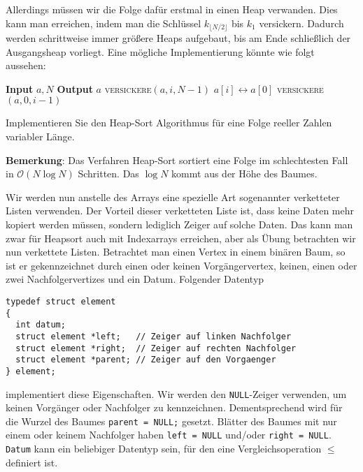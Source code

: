 \documentclass[tikz,12pt]{article}
\begin{document}
Allerdings müssen wir die Folge dafür erstmal in einen Heap verwanden. 
Dies kann man erreichen, indem man die Schlüssel $k_{\lfloor N/2\rfloor}$ bis $k_1$ versickern. 
Dadurch werden schrittweise immer größere Heaps aufgebaut, bis am Ende schließlich der Ausgangsheap vorliegt. 
Eine mögliche Implementierung könnte wie folgt aussehen:
\begin{algorithmic}[1]
  \State \textbf{Input} $a,N$
  \State \textbf{Output} $a$
  \State \textsc{versickere}$(a, i, N-1)$
  \EndFor
  \State $a[i]\leftrightarrow a[0]$
  \State \textsc{versickere}$(a, 0, i-1)$
  \EndFor
  \EndProcedure
\end{algorithmic}
Implementieren Sie den Heap-Sort Algorithmus für eine Folge reeller Zahlen variabler Länge.

\textbf{Bemerkung}: Das Verfahren Heap-Sort sortiert eine Folge im schlechtesten Fall in $\mathcal{O}(N\log N)$ Schritten.
Das $\log N$ kommt aus der Höhe des Baumes.

Wir werden nun anstelle des Arrays eine spezielle Art sogenannter verketteter Listen verwenden.
Der Vorteil dieser verketteten Liste ist, dass keine Daten mehr kopiert werden müssen, sondern lediglich Zeiger auf solche Daten.
Das kann man zwar für Heapsort auch mit Indexarrays erreichen, aber als Übung betrachten wir nun verkettete Listen.
Betrachtet man einen Vertex in einem binären Baum, so ist er gekennzeichnet durch einen oder keinen Vorgängervertex, keinen, einen oder zwei Nachfolgervertizes und ein Datum.
Folgender Datentyp 
\begin{lstlisting}
typedef struct element
{
  int datum;
  struct element *left;   // Zeiger auf linken Nachfolger
  struct element *right;  // Zeiger auf rechten Nachfolger
  struct element *parent; // Zeiger auf den Vorgaenger
} element;
\end{lstlisting}
implementiert diese Eigenschaften.
Wir werden den \texttt{NULL}-Zeiger verwenden, um keinen Vorgänger oder Nachfolger zu kennzeichnen.
Dementsprechend wird für die Wurzel des Baumes \texttt{parent = NULL;} gesetzt.
Blätter des Baumes mit nur einem oder keinem Nachfolger haben \texttt{left = NULL} und/oder \texttt{right = NULL}.
\texttt{Datum} kann ein beliebiger Datentyp sein, für den eine Vergleichsoperation $\leq$ definiert ist.
\end{document}
